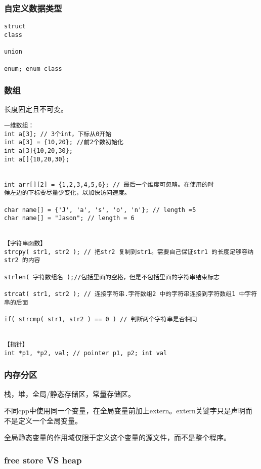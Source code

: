 \documentclass[UTF8]{../computerUniverse}
\begin{document}
\subsubsection{自定义数据类型}

\begin{lstlisting}
struct
class

union

enum; enum class

\end{lstlisting}



\subsubsection{数组}

长度固定且不可变。
\begin{lstlisting}
一维数组：
int a[3]; // 3个int，下标从0开始
int a[3] = {10,20}; //前2个数初始化
int a[3]{10,20,30};
int a[]{10,20,30};


int arr[][2] = {1,2,3,4,5,6}; // 最后一个维度可忽略。在使用的时
候左边的下标要尽量少变化，以加快访问速度。

char name[] = {'J', 'a', 's', 'o', 'n'}; // length =5
char name[] = "Jason"; // length = 6


【字符串函数】
strcpy( str1, str2 ); // 把str2 复制到str1。需要自己保证str1 的长度足够容纳str2 的内容

strlen( 字符数组名 );//包括里面的空格，但是不包括里面的字符串结束标志

strcat( str1, str2 ); // 连接字符串.字符数组2 中的字符串连接到字符数组1 中字符串的后面

if( strcmp( str1, str2 ) == 0 ) // 判断两个字符串是否相同


【指针】
int *p1, *p2, val; // pointer p1, p2; int val

\end{lstlisting}


\subsubsection{内存分区}
栈，堆，全局/静态存储区，常量存储区。

不同cpp中使用同一个变量，在全局变量前加上extern。extern关键字只是声明而不是定义一个全局变量。

全局静态变量的作用域仅限于定义这个变量的源文件，而不是整个程序。

\subsubsection{free store VS heap}
\end{document}
